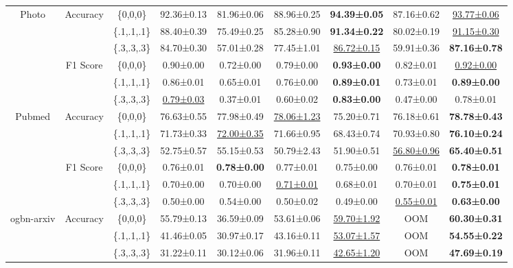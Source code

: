 \documentclass[sigconf, anonymous, review]{acmart}
\begin{document}
\begin{table}
{\begin{tabular}{ccccccccc}
          \midrule
          \multirow{6}{*}{Photo}& \multirow{3}{*}{Accuracy} &\{0,0,0\}&92.36±0.13&81.96±0.06&88.96±0.25&\textbf{94.39±0.05}&87.16±0.62&\underline{93.77±0.06}\\
            &&\{.1,.1,.1\}&88.40±0.39&75.49±0.25&85.28±0.90&\textbf{91.34±0.22}&80.02±0.19&\underline{91.15±0.30} \\
            &&\{.3,.3,.3\}&84.70±0.30&57.01±0.28&77.45±1.01&\underline{86.72±0.15}&59.91±0.36&\textbf{87.16±0.78}\\

            &\multirow{3}{*}{F1 Score}&\{0,0,0\}&0.90±0.00&0.72±0.00&0.79±0.00&\textbf{0.93±0.00}&0.82±0.01&\underline{0.92±0.00}\\
            &&\{.1,.1,.1\}&0.86±0.01&0.65±0.01&0.76±0.00&\textbf{0.89±0.01}&0.73±0.01&\textbf{0.89±0.00} \\
            &&\{.3,.3,.3\}&\underline{0.79±0.03}&0.37±0.01&0.60±0.02&\textbf{0.83±0.00}&0.47±0.00&0.78±0.01\\
          
          \midrule
            \multirow{6}{*}{Pubmed}& \multirow{3}{*}{Accuracy} &\{0,0,0\}&76.63±0.55&77.98±0.49&\underline{78.06±1.23}&75.20±0.71&76.18±0.61&\textbf{78.78±0.43}\\
            &&\{.1,.1,.1\}&71.73±0.33&\underline{72.00±0.35}&71.66±0.95&68.43±0.74&70.93±0.80&\textbf{76.10±0.24}  \\
            &&\{.3,.3,.3\}&52.75±0.57&55.15±0.53&50.79±2.43&51.90±0.51&\underline{56.80±0.96}&\textbf{65.40±0.51}\\

              &\multirow{3}{*}{F1 Score}&\{0,0,0\}&0.76±0.01&\textbf{0.78±0.00}&0.77±0.01&0.75±0.00&0.76±0.01&\textbf{0.78±0.01}\\
            &&\{.1,.1,.1\}&0.70±0.00&0.70±0.00&\underline{0.71±0.01}&0.68±0.01&0.70±0.01&\textbf{0.75±0.01} \\
            &&\{.3,.3,.3\}&0.50±0.00&0.54±0.00&0.50±0.02&0.49±0.00&\underline{0.55±0.01}&\textbf{0.63±0.00}\\
          
          \midrule
            \multirow{6}{*}{ogbn-arxiv} & \multirow{3}{*}{Accuracy}&\{0,0,0\}&55.79±0.13&36.59±0.09&53.61±0.06&\underline{59.70±1.92}&OOM&\textbf{60.30±0.31}\\
            &&\{.1,.1,.1\}&41.46±0.05&30.97±0.17&43.16±0.11&\underline{53.07±1.57}&OOM&\textbf{54.55±0.22}\\
            &&\{.3,.3,.3\}&31.22±0.11&30.12±0.06&31.96±0.11&\underline{42.65±1.20}&OOM&\textbf{47.69±0.19}\\
          

\end{tabular}}
\end{table}
\end{document}
